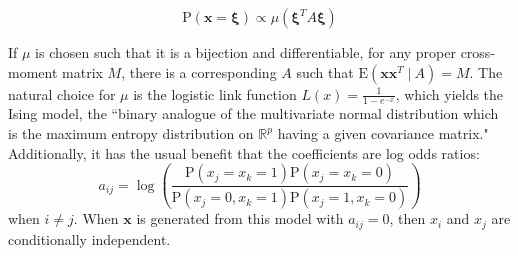 \documentclass[11pt]{article}
\newcommand{\R}{\mathbb{R}}
\newcommand{\p}{\mathrm{P}}
\newcommand{\E}{\mathrm{E}}
\newcommand{\st}{ \; \big | \:}
\theoremstyle{definition}
\begin{document}
    \[ \p(\mathbf x=\mathbf \xi) \propto \mu(\mathbf{\xi}^T A\mathbf \xi)\]

    If $\mu$ is chosen such that it is a bijection and differentiable, for any proper cross-moment matrix $M$, there is a corresponding $A$ such that $\E(\mathbf x \mathbf x^T \st A)=M$. The natural choice for $\mu$ is the logistic link function $L(x)=\frac{1}{1-e^{-x}}$, which yields the Ising model, the ``binary analogue of the multivariate normal distribution which is the maximum entropy distribution on $\R^p$ having a given covariance matrix." Additionally, it has the usual benefit that the coefficients are log odds ratios:
    \[a_{ij} = \log\left(\frac{\p(x_j=x_k=1)\p(x_j=x_k=0)}{\p(x_j=0,x_k=1)\p(x_j=1,x_k=0)}\right) \]
    when $i\neq j$. When $\mathbf x$ is generated from this model with $a_{ij}=0$, then $x_i$ and $x_j$ are conditionally independent.  \par
\end{document}
